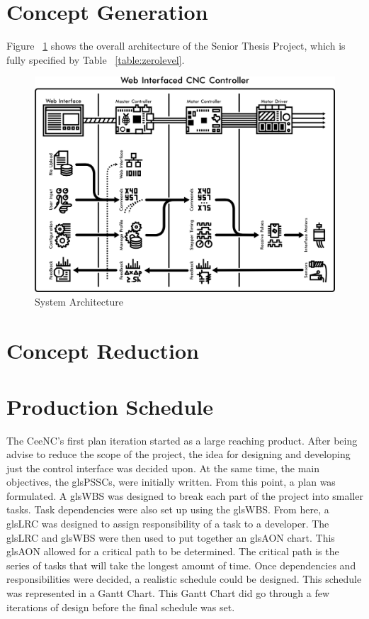 
\section{Concept Generation}
Figure ~\ref{fig:architecture} shows the overall architecture of the Senior Thesis Project, which is fully specified by Table ~\ref{table:zerolevel}.

\begin{figure}[h]
	\centering
	\includegraphics[width=1\textwidth]{architecture.png}
	\caption{System Architecture}
	\label{fig:architecture}
\end{figure}

\section{Concept Reduction}

\section{Production Schedule}
The CeeNC's first plan iteration started as a large reaching product.
After being advise to reduce the scope of the project, the idea for designing and developing just the control interface was decided upon.
At the same time, the main objectives, the gls{PSSC}s, were initially written.
From this point, a plan was formulated.
A gls{WBS} was designed to break each part of the project into smaller tasks.
Task dependencies were also set up using the gls{WBS}.
From here, a gls{LRC} was designed to assign responsibility of a task to a developer.
The gls{LRC} and gls{WBS} were then used to put together an gls{AON} chart.
This gls{AON} allowed for a critical path to be determined.
The critical path is the series of tasks that will take the longest amount of time.
Once dependencies and responsibilities were decided, a realistic schedule could be designed.
This schedule was represented in a Gantt Chart.
This Gantt Chart did go through a few iterations of design before the final schedule was set.

